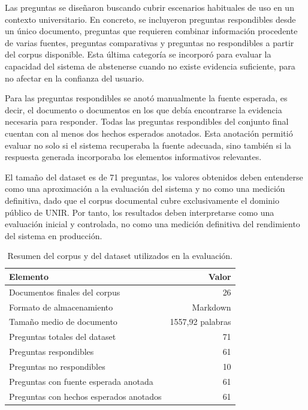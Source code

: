 Las preguntas se diseñaron buscando cubrir escenarios habituales de uso en un contexto universitario. 
En concreto, se incluyeron preguntas respondibles desde un único documento, preguntas que requieren combinar información procedente de varias fuentes, preguntas comparativas y preguntas no respondibles a partir del corpus disponible. 
Esta última categoría se incorporó para evaluar la capacidad del sistema de abstenerse cuando no existe evidencia suficiente, para no afectar en la confianza del usuario.

Para las preguntas respondibles se anotó manualmente la fuente esperada, es decir, el documento o documentos en los que debía encontrarse la evidencia necesaria para responder. 
Todas las preguntas respondibles del conjunto final cuentan con al menos dos hechos esperados anotados.
Esta anotación permitió evaluar no solo si el sistema recuperaba la fuente adecuada, sino también si la respuesta generada incorporaba los elementos informativos relevantes. 

El tamaño del dataset es de 71 preguntas, los valores obtenidos deben entenderse como una aproximación a la evaluación del sistema y no como una medición definitiva, dado que el corpus documental cubre exclusivamente el dominio público de UNIR. 
Por tanto, los resultados deben interpretarse como una evaluación inicial y controlada, no como una medición definitiva del rendimiento del sistema en producción.

\begin{table}[H]
\centering
\begin{tabular}{lr}
\hline
\textbf{Elemento} & \textbf{Valor} \\
\hline
Documentos finales del corpus & 26 \\
Formato de almacenamiento & Markdown \\
Tamaño medio de documento & 1557,92 palabras \\
Preguntas totales del dataset & 71 \\
Preguntas respondibles & 61 \\
Preguntas no respondibles & 10 \\
Preguntas con fuente esperada anotada & 61 \\
Preguntas con hechos esperados anotados & 61 \\
\hline
\end{tabular}
\caption{Resumen del corpus y del dataset utilizados en la evaluación.}
\label{tab:resumen_dataset}
\end{table}

